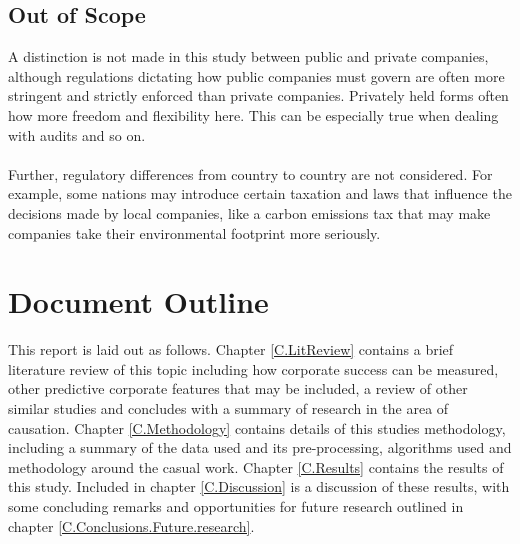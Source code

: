 {\subsection{Out of Scope}
{A distinction is not made in this study between public and private companies, although regulations dictating how public companies must govern are often more stringent and strictly enforced than private companies. Privately held forms often how more freedom and flexibility here. This can be especially true when dealing with audits and so on. \\\\
Further, regulatory differences from country to country are not considered. For example, some nations may introduce certain taxation and laws that influence the decisions made by local companies, like a carbon emissions tax that may make companies take their environmental footprint more seriously.} 
}
\section{Document Outline}
{This report is laid out as follows. Chapter \ref{C.LitReview} contains a brief literature review of this topic including how corporate success can be measured, other predictive corporate features that may be included, a review of other similar studies and concludes with a summary of research in the area of causation. Chapter \ref{C.Methodology} contains details of this studies methodology, including a summary of the data used and its pre-processing, algorithms used and methodology around the casual work. Chapter \ref{C.Results} contains the results of this study. Included in chapter \ref{C.Discussion} is a discussion of these results, with some concluding remarks and opportunities for future research outlined in chapter \ref{C.Conclusions.Future.research}.      }
